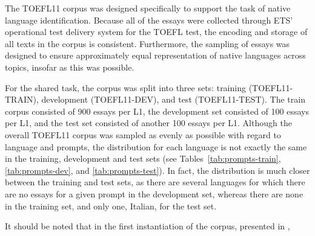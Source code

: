 \documentclass[11pt,letterpaper]{article}
\begin{document}
The TOEFL11 corpus was designed specifically to support the task of native
language identification.  Because all of the essays were collected through ETS'
operational test delivery system for the TOEFL\textsuperscript{\textregistered}
test, the encoding and storage of all texts in the corpus is consistent.
Furthermore, the sampling of essays was designed to ensure approximately equal
representation of native languages across topics, insofar as this was possible.

For the shared task, the corpus was split into three sets: training (TOEFL11-TRAIN),
development (TOEFL11-DEV), and test (TOEFL11-TEST). The train corpus consisted
of 900 essays per L1, the development set consisted of 100 essays per L1,
and the test set consisted of another 100 essays per L1.
Although the overall TOEFL11 corpus was sampled as evenly
as possible with regard to language and prompts, the distribution for each
language is not exactly the same in the training, development and test sets (see
Tables~\ref{tab:prompts-train}, \ref{tab:prompts-dev}, and
\ref{tab:prompts-test}). In fact, the distribution is much closer between the
training and test sets, as there are several languages for which there are no
essays for a given prompt in the development set, whereas there are none in the
training set, and only one, Italian, for the test set.

It should be noted that in the first instantiation of the corpus,
presented in \cite{tetreault-EtAl:2012:PAPERS},
\end{document}

